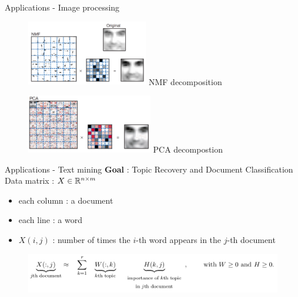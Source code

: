 \begin{frame}{Applications - Image processing}
    \begin{figure}[h!]
        \centering
        \begin{minipage}{0.45\textwidth}
            \centering
            \includegraphics[width=5.3cm]{NMFcomp.png}
            NMF decomposition
        \end{minipage}
        \hfill
        \begin{minipage}{0.45\textwidth}
            \centering
            \includegraphics[width=5.5cm]{PCAcomp.png}
            PCA decompostion
        \end{minipage}
    \end{figure}
\end{frame}
\begin{frame}{Applications - Text mining}
    \textbf{Goal} : Topic Recovery and Document Classification\\
    \vspace{0.7cm}
    Data matrix : $X\in\mathbb{R}^{n\times m}$\\
    \begin{itemize}
        \item each column : a document
        \item each line : a word
        \item $X(i,j)$ : number of times the $i$-th word appears in the $j$-th document
    \end{itemize}
    \begin{figure}
        \centering
        \includegraphics[width=0.9\linewidth]{NMF_app2.png}
    \end{figure}
\end{frame}